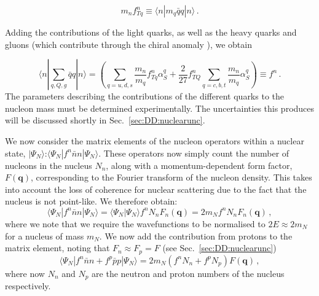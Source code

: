 \begin{equation}
m_n f_{Tq}^n \equiv \langle n|m_q\bar{q}q|n \rangle \,.
\end{equation}

Adding the contributions of the light quarks, as well as the heavy quarks and gluons (which contribute through the chiral anomaly \cite{Shifman:1978}), we obtain

\begin{equation}
\langle n| \sum_{q,Q,g} \bar{q} q |n \rangle  = \left(\sum_{q=u,d,s}\frac{m_n}{m_q} f_{Tq}^n \alpha_S^q + \frac{2}{27} f_{TQ}^n \sum_{q = c,b,t} \frac{m_n}{m_q} \alpha_S^q\right) \equiv f^n\,.
\end{equation}
The parameters describing the contributions of the different quarks to the nucleon mass must be determined experimentally. The uncertainties this produces will be discussed shortly in Sec.~\ref{sec:DD:nuclearunc}.

We now consider the matrix elements of the nucleon operators within a nuclear state, $|\Psi_N\rangle$:$\langle \Psi_N|f^n \bar{n}n|\Psi_N\rangle$. These operators now simply count the number of nucleons in the nucleus $N_n$, along with a momentum-dependent form factor, $F(\textbf{q})$, corresponding to the Fourier transform of the nucleon density. This takes into account the loss of coherence for nuclear scattering due to the fact that the nucleus is not point-like. We therefore obtain:
\begin{equation}
\langle \Psi_N|f^n \bar{n}n|\Psi_N\rangle = \langle \Psi_N|\Psi_N\rangle f^n N_n F_n(\textbf{q}) = 2m_N f^n N_n F_n(\textbf{q})\,,
\end{equation}
where we note that we require the wavefunctions to be normalised to \(2E \approx 2m_N\) for a nucleus of mass \(m_N\). We now add the contribution from protons to the matrix element, noting that \(F_n \approx F_p = F\) (see Sec.~\ref{sec:DD:nuclearunc})
\begin{equation}
\langle \Psi_N|f^n \bar{n}n + f^p \bar{p}p|\Psi_N\rangle = 2m_N (f^n N_n + f^p N_p) F(\textbf{q})\,,
\end{equation}
where now $N_n$ and $N_p$ are the neutron and proton numbers of the nucleus respectively.

